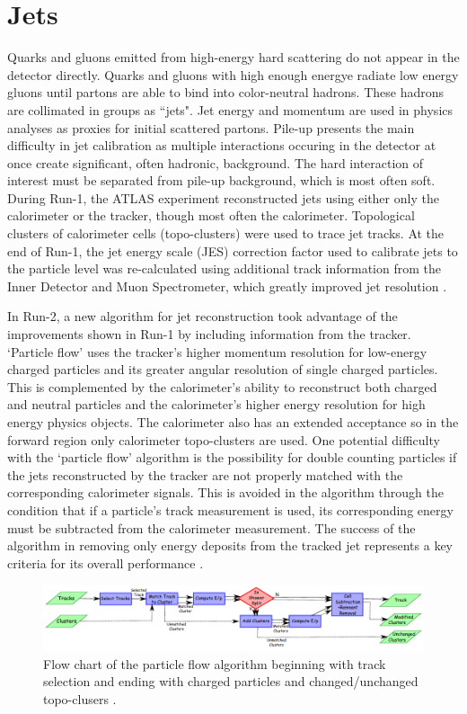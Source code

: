 \section{Jets}
Quarks and gluons emitted from high-energy hard scattering do not appear in the detector directly. Quarks and gluons with high enough energye radiate low energy gluons until partons are able to bind into color-neutral hadrons. These hadrons are collimated in groups as ``jets". Jet energy and momentum are used in physics analyses as proxies for initial scattered partons. Pile-up presents the main difficulty in jet calibration as multiple interactions occuring in the detector at once create significant, often hadronic, background. The hard interaction of interest must be separated from pile-up background, which is most often soft. During Run-1, the ATLAS experiment reconstructed jets using either only the calorimeter or the tracker, though most often the calorimeter. Topological clusters of calorimeter cells (topo-clusters) were used to trace jet tracks. At the end of Run-1, the jet energy scale (JES) correction factor used to calibrate jets to the particle level was re-calculated using additional track information from the Inner Detector and Muon Spectrometer, which greatly improved jet resolution \cite{JetRun1}. 

In Run-2, a new algorithm for jet reconstruction took advantage of the improvements shown in Run-1 by including information from the tracker. `Particle flow' uses the tracker's higher momentum resolution for low-energy charged particles and its greater angular resolution of single charged particles. This is complemented by the calorimeter's ability to reconstruct both charged and neutral particles and the calorimeter's higher energy resolution for high energy physics objects. The calorimeter also has an extended acceptance so in the forward region only calorimeter topo-clusters are used. One potential difficulty with the `particle flow' algorithm is the possibility for double counting particles if the jets reconstructed by the tracker are not properly matched with the corresponding calorimeter signals. This is avoided in the algorithm through the condition that if a particle's track measurement is used, its corresponding energy must be subtracted from the calorimeter measurement. The success of the algorithm in removing only energy deposits from the tracked jet represents a key criteria for its overall performance \cite{ParticleFlow}.

\begin{figure}[!h]
        \centering
    \includegraphics[width=.85\textwidth]{Pictures/ParticleFlow.png}
    \caption{Flow chart of the particle flow algorithm beginning with track selection and ending with charged particles and changed/unchanged topo-clusers \cite{ParticleFlow}.}
    \label{fig:ParticleFlow}
\end{figure}

